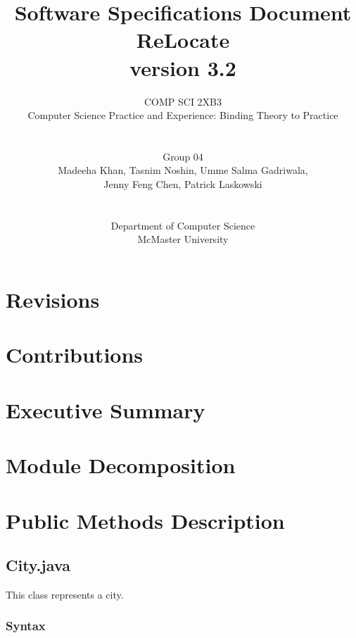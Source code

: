 \documentclass[12pt,fleqn]{article}
\title{Software Specifications Document \\ReLocate\\version 3.2}
\author{COMP SCI 2XB3\\  
Computer Science Practice and Experience: Binding Theory to Practice\\ \\ \\
Group 04\\Madeeha Khan, Tasnim Noshin, Umme Salma Gadriwala,\\ 
Jenny Feng Chen, Patrick Laskowski \\ \\ \\
Department of Computer Science\\ 
McMaster University}
\begin{document}
\maketitle

\newpage
\section*{Revisions}\label{revisions}



\newpage
\section*{Contributions}\label{contributions}




\newpage
\section*{Executive Summary}



\newpage
\section*{Module Decomposition}




\newpage
\section*{Public Methods Description}\label{public}
\subsection*{City.java}\label{city}
This class represents a city.
\subsubsection* {Syntax}
\end{document}
